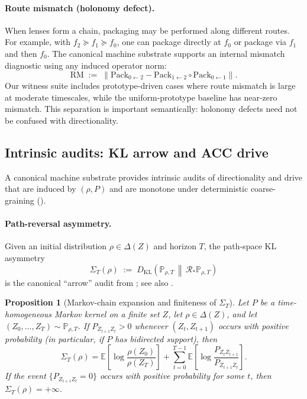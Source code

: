 \documentclass[11pt]{article}
\newtheorem{proposition}[theorem]{Proposition}
\theoremstyle{definition}
\theoremstyle{remark}
\begin{document}
\paragraph{Route mismatch (holonomy defect).}
When lenses form a chain, packaging may be performed along different routes.
For example, with $f_2\succeq f_1\succeq f_0$, one can package directly at $f_0$ or package via $f_1$ and then $f_0$.
The canonical machine substrate supports an internal mismatch diagnostic using any induced operator norm:
\[
\mathrm{RM}
\;:=\;
\left\| \mathrm{Pack}_{0\leftarrow 2} - \mathrm{Pack}_{1\leftarrow 2}\circ \mathrm{Pack}_{0\leftarrow 1} \right\|.
\]
Our witness suite includes prototype-driven cases where route mismatch is large at moderate timescales, while the uniform-prototype baseline has near-zero mismatch.
This separation is important semantically: holonomy defects need not be confused with directionality.

\subsection{Intrinsic audits: KL arrow and ACC drive}

A canonical machine substrate provides intrinsic audits of directionality and drive that are induced by $(\rho,P)$ and are monotone under deterministic coarse-graining ().

\paragraph{Path-reversal asymmetry.}
Given an initial distribution $\rho\in\Delta(Z)$ and horizon $T$, the path-space KL asymmetry
\[
\Sigma_T(\rho)
\;:=\;
D_{\mathrm{KL}}\!\left(\mathbb P_{\rho,T}\,\middle\|\,\mathcal R_*\mathbb P_{\rho,T}\right)
\]
is the canonical ``arrow'' audit from \citet{sixbirds2026}; see also \citep{kullback1951,cover2006,seifert2012}.
\begin{proposition}[Markov-chain expansion and finiteness of $\Sigma_T$]
\label{prop:sigma-expansion}
Let $P$ be a time-homogeneous Markov kernel on a finite set $Z$, let $\rho\in\Delta(Z)$, and let $(Z_0,\dots,Z_T)\sim\mathbb P_{\rho,T}$.
If $P_{Z_{t+1}Z_t}>0$ whenever $(Z_t,Z_{t+1})$ occurs with positive probability (in particular, if $P$ has bidirected support), then
\begin{equation}
\label{eq:sigma-expansion}
\Sigma_T(\rho)
=
\mathbb E\!\left[\log \frac{\rho(Z_0)}{\rho(Z_T)}\right]
+
\sum_{t=0}^{T-1}\mathbb E\!\left[\log \frac{P_{Z_t Z_{t+1}}}{P_{Z_{t+1} Z_t}}\right].
\end{equation}
If the event $\{P_{Z_{t+1}Z_t}=0\}$ occurs with positive probability for some $t$, then $\Sigma_T(\rho)=+\infty$.
\end{proposition}
\end{document}

